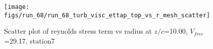 \begin{figure}[H]
\centering
\texttt{[image: figs/run\_68/run\_68\_turb\_visc\_ettap\_top\_vs\_r\_mesh\_scatter]}
\caption{Scatter plot of reynolds stress term vs radius at $z/c$=10.00, $V_{free}$=29.17, station7}
\label{fig:run_68_turb_visc_ettap_top_vs_r_mesh_scatter}
\end{figure}


